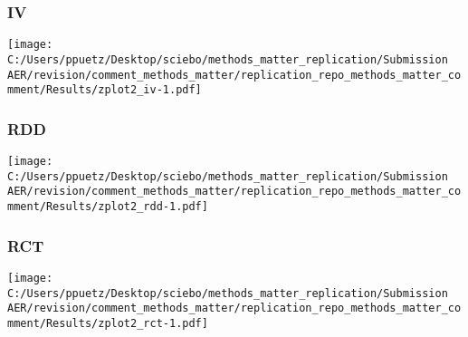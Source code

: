 \documentclass[
]{article}
\begin{document}
\hypertarget{iv-1}{%
\subsubsection{IV}\label{iv-1}}

\texttt{[image: C:/Users/ppuetz/Desktop/sciebo/methods\_matter\_replication/Submission AER/revision/comment\_methods\_matter/replication\_repo\_methods\_matter\_comment/Results/zplot2\_iv-1.pdf]}

\hypertarget{rdd-1}{%
\subsubsection{RDD}\label{rdd-1}}

\texttt{[image: C:/Users/ppuetz/Desktop/sciebo/methods\_matter\_replication/Submission AER/revision/comment\_methods\_matter/replication\_repo\_methods\_matter\_comment/Results/zplot2\_rdd-1.pdf]}

\hypertarget{rct-1}{%
\subsubsection{RCT}\label{rct-1}}

\texttt{[image: C:/Users/ppuetz/Desktop/sciebo/methods\_matter\_replication/Submission AER/revision/comment\_methods\_matter/replication\_repo\_methods\_matter\_comment/Results/zplot2\_rct-1.pdf]}
\end{document}
